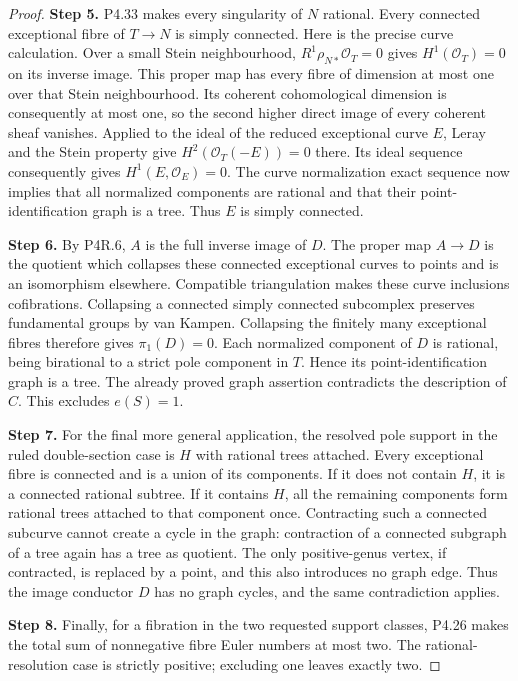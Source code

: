 \begin{proof}
\noindent\textbf{Step 5.} P4.33 makes every singularity of $N$ rational.
Every connected exceptional fibre of $T\to N$
is simply connected. Here is the precise curve
calculation. Over a small Stein neighbourhood,
$R^1\rho_{N*}\mathcal O_T=0$ gives
$H^1(\mathcal O_T)=0$ on its inverse image.
This proper map has every fibre of dimension at
most one over that Stein neighbourhood. Its coherent
cohomological dimension is consequently at most
one, so the second higher direct image of every
coherent sheaf vanishes. Applied to the ideal of the reduced
exceptional curve $E$, Leray and the Stein property
give $H^2(\mathcal O_T(-E))=0$ there. Its ideal
sequence consequently gives $H^1(E,\mathcal O_E)=0$.
The curve normalization exact sequence now implies
that all normalized components are rational and
that their point-identification graph is a tree.
Thus $E$ is simply connected.

\noindent\textbf{Step 6.} By P4R.6, $A$ is the full inverse image of $D$.
The proper map $A\to D$ is the quotient which
collapses these connected exceptional curves to
points and is an isomorphism elsewhere.
Compatible triangulation makes these curve
inclusions cofibrations. Collapsing a connected
simply connected subcomplex preserves fundamental
groups by van Kampen. Collapsing the finitely many
exceptional fibres therefore gives $\pi_1(D)=0$.
Each normalized component of $D$ is rational,
being birational to a strict pole component in
$T$. Hence its point-identification graph is a
tree. The already proved graph assertion contradicts
the description of $C$. This excludes $e(S)=1$.

\noindent\textbf{Step 7.} For the final more general application, the
resolved pole support in the ruled double-section
case is $H$ with rational trees attached.
Every exceptional fibre is connected and is a
union of its components. If it does not contain
$H$, it is a connected rational subtree. If it
contains $H$, all the remaining components form
rational trees attached to that component once.
Contracting such a connected subcurve cannot
create a cycle in the graph: contraction of a
connected subgraph of a tree again has a tree
as quotient. The only positive-genus vertex,
if contracted, is replaced by a point, and this
also introduces no graph edge. Thus the image
conductor $D$ has no graph cycles, and the same
contradiction applies.

\noindent\textbf{Step 8.} Finally, for a fibration in the two requested
support classes, P4.26 makes the total sum of
nonnegative fibre Euler numbers at most two.
The rational-resolution case is strictly positive;
excluding one leaves exactly two.
\end{proof}


